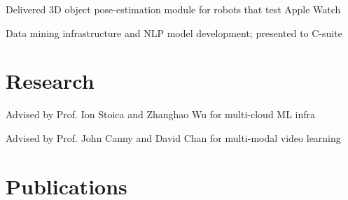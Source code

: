 \documentclass[]{deedy-resume-openfont}
\begin{document}
\begin{minipage}[t]{0.66\textwidth}
\begin{tightemize}
\item Delivered 3D object pose-estimation module for robots that test Apple Watch
\end{tightemize}
\sectionsep

\begin{tightemize}
\item Data mining infrastructure and NLP model development; presented to C-suite
\end{tightemize}
\sectionsep


\sectionsep


\section{Research}
\begin{tightemize}
\item Advised by Prof. Ion Stoica and Zhanghao Wu for multi-cloud ML infra
\end{tightemize}
\sectionsep

\begin{tightemize}
\item Advised by Prof. John Canny and David Chan for multi-modal video learning
\end{tightemize}
\sectionsep



\section{Publications} 
\renewcommand\refname{\vskip -1.5em} %


\nocite{*}



\end{minipage}
\end{document}
